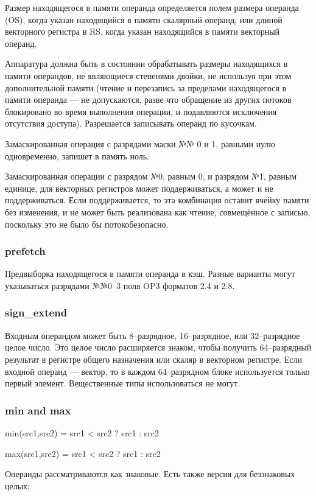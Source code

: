 \documentclass[forwardcom.tex]{subfiles}
\begin{document}
Размер находящегося в памяти операнда определяется полем размера операнда (OS), когда указан находящийся в памяти скалярный операнд, или длиной векторного регистра в RS, когда указан находящийся в памяти векторный операнд.

Аппаратура должна быть в состоянии обрабатывать размеры находящихся в памяти операндов, не являющиеся степенями двойки, не используя при этом дополнительной памяти (чтение и перезапись за пределами находящегося в памяти операнда --- не допускаются, разве что обращение из других потоков блокировано во время выполнения операции, и подавляются исключения отсутствия доступа). Разрешается записывать операнд по кусочкам.

Замаскированная операция с разрядами маски №№ 0 и 1, равными нулю одновременно, запишет в память ноль.

Замаскированная операции с разрядом №0, равным 0, и разрядом №1, равным единице, для векторных регистров может поддерживаться, а может и не поддерживаться. Если поддерживается, то эта комбинация оставит ячейку памяти без изменения, и не может быть реализована как чтение, совмещённое с записью, поскольку это не было бы потокобезопасно.

\subsubsection{prefetch}
Предвыборка находящегося в памяти операнда в кэш. Разные варианты могут указываться разрядами №№0--3 поля OP3 форматов 2.4 и 2.8.

\subsubsection{sign\_extend}
Входным операндом может быть 8--разрядное, 16--разрядное, или 32--разрядное целое число. Это целое число расширяется знаком, чтобы получить 64--разрядный результат в регистре общего назначения или скаляр в векторном регистре. Если входной операнд --- вектор, то в каждом 64--разрядном блоке используется только первый элемент. Вещественные типы использоваться не могут.

\subsubsection{min and max}
min(src1,src2) = src1 \textless{} src2 ? src1 : src2

max(src1,src2) = src1 \textless{} src2 ? src1 : src2

Операнды рассматриваются как знаковые. Есть также версия для беззнаковых целых:
\end{document}
